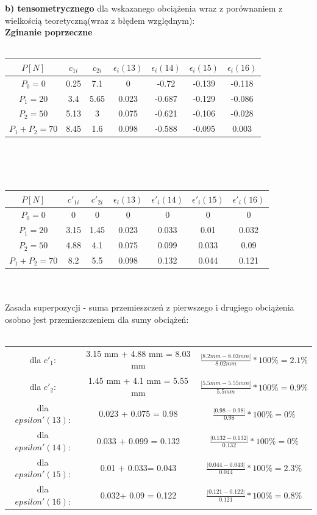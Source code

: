 \documentclass[11pt]{article}
\begin{document}
\textbf{b) tensometrycznego} dla wskazanego obciążenia wraz z porównaniem z wielkością teoretyczną(wraz z błędem względnym):\\






\textbf{Zginanie poprzeczne}\\\\
\begin{tabular}{|c|c|c|c|c|c|c|}\hline
$P[N]$ & $c_{1i}$ & $c_{2i}$ & $\epsilon_i(13)$ & $\epsilon_i(14)$ & $\epsilon_i(15)$ & $\epsilon_i(16)$\\ \hline
$P_0 = 0$ & 0.25 & 7.1 & 0 & -0.72 & -0.139 & -0.118\\ \hline
$P_1 = 20$ & 3.4 & 5.65 & 0.023 & -0.687 & -0.129 & -0.086\\ \hline
$P_2 = 50$ & 5.13 & 3 & 0.075 & -0.621 & -0.106 & -0.028\\ \hline
$P_1 + P_2 = 70$ & 8.45 & 1.6 & 0.098 & -0.588 & -0.095 & 0.003\\ \hline
\end{tabular}\\\\
\\
\begin{tabular}{|c|c|c|c|c|c|c|}\hline
$P[N]$ & $c'_{1i}$ & $c'_{2i}$ & $\epsilon_i(13)$ & $\epsilon'_i(14)$ & $\epsilon'_i(15)$ & $\epsilon'_i(16)$\\ \hline
$P_0 = 0$ & 0 & 0 & 0 & 0 & 0 & 0\\ \hline
$P_1 = 20$ & 3.15 & 1.45 & 0.023 & 0.033 & 0.01 & 0.032\\ \hline
$P_2 = 50$ & 4.88 & 4.1 & 0.075 & 0.099 & 0.033 & 0.09\\ \hline
$P_1 + P_2 = 70$ & 8.2 & 5.5 & 0.098 & 0.132 & 0.044 & 0.121\\ \hline

\end{tabular}\\\\
Zasada superpozycji - suma przemieszczeń z pierwszego i drugiego obciążenia osobno jest przemieszczeniem dla sumy obciążeń:\\\\
\begin{tabular}{c|c|c}
dla $c'_1$: & 3.15 mm + 4.88 mm = 8.03 mm & $\frac{|8.2 mm - 8.03 mm|}{8.02 mm} * 100\% = 2.1\%$\\
dla $c'_2$: & 1.45 mm + 4.1 mm = 5.55 mm & $\frac{|5.5 mm - 5.55 mm|}{5.5 mm} * 100\% = 0.9\%$\\
dla $epsilon'(13)$: & 0.023 + 0.075 = 0.98 & $\frac{|0.98 - 0.98|}{0.98} * 100\% = 0\%$\\
dla $epsilon'(14)$: & 0.033 + 0.099 = 0.132 & $\frac{|0.132 - 0.132|}{0.132} * 100\% = 0\%$\\
dla $epsilon'(15)$: & 0.01 + 0.033= 0.043 & $\frac{|0.044 - 0.043|}{0.044} * 100\% = 2.3\%$\\
dla $epsilon'(16)$: & 0.032+ 0.09 = 0.122 & $\frac{|0.121 - 0.122|}{0.121} * 100\% = 0.8\%$\\
\end{tabular}\\\\
\end{document}
